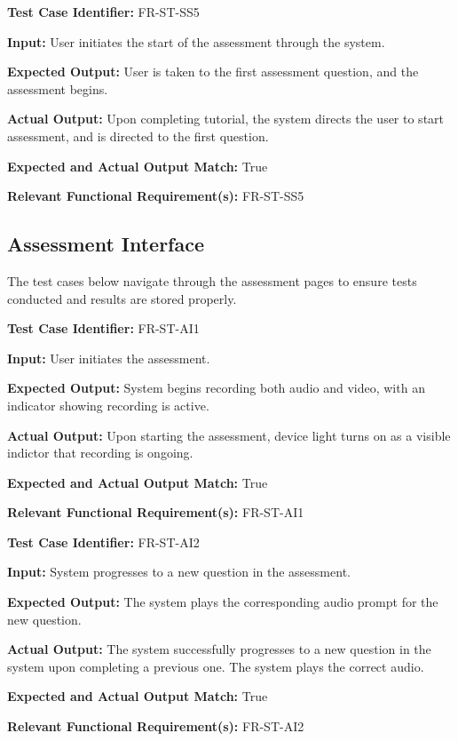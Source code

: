\documentclass[12pt, titlepage]{article}
\begin{document}
\begin{mdframed}[linewidth=0.5mm] \par
  \textbf{Test Case Identifier:} FR-ST-SS5 \par
  \textbf{Input:} User initiates the start of the assessment through the system.
  \par
  \textbf{Expected Output:} User is taken to the first assessment question, and the assessment begins.   \par
  \textbf{Actual Output:} Upon completing tutorial, the system directs the user to start assessment, and is directed to the first question. \par
  \textbf{Expected and Actual Output Match:} True \par
  \textbf{Relevant Functional Requirement(s):} FR-ST-SS5 
\end{mdframed}

\newpage{}

\subsection{Assessment Interface}
\hspace{2em}The test cases below navigate through the assessment pages to ensure tests conducted and results 
are stored properly. 

\begin{mdframed}[linewidth=0.5mm] \par
  \textbf{Test Case Identifier:} FR-ST-AI1 \par
  \textbf{Input:} User initiates the assessment.\par
  \textbf{Expected Output:}  System begins recording both audio and video, with an indicator showing
  recording is active. \par
  \textbf{Actual Output:} Upon starting the assessment, device light turns on as a visible indictor that recording is ongoing. \par
  \textbf{Expected and Actual Output Match:} True \par
  \textbf{Relevant Functional Requirement(s):} FR-ST-AI1
\end{mdframed}

\begin{mdframed}[linewidth=0.5mm] \par
  \textbf{Test Case Identifier:} FR-ST-AI2 \par
  \textbf{Input:} System progresses to a new question in the assessment.
  \par
  \textbf{Expected Output:} The system plays the corresponding audio prompt for the new question. 
  \par
  \textbf{Actual Output:} The system successfully progresses to a new question in the system upon completing a previous one.
  The system plays the correct audio.\par 
  \textbf{Expected and Actual Output Match:} True \par
  \textbf{Relevant Functional Requirement(s):} FR-ST-AI2 
\end{mdframed}
\end{document}
